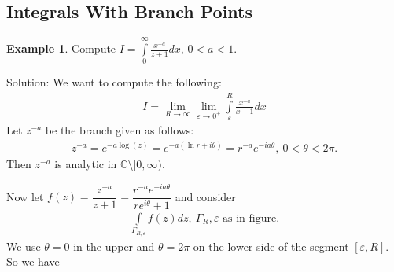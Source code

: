 \documentclass[12pt, a4paper]{article}
\theoremstyle{plain}
\theoremstyle{definition}
\newtheorem{example}{Example} %
\begin{document}
		\subsection{Integrals With Branch Points} %
		\label{sub:integrals_with_branch_points}
			\begin{example}
				Compute $\displaystyle I=\int\limits_{0}^{\infty}\frac{x^{-a}}{z+1}dx$, $0<a<1$.

				Solution: We want to compute the following:
				\begin{align*}
					I = \lim\limits_{R\to\infty}\lim\limits_{\varepsilon\to 0^+}\int\limits_{\varepsilon}^{R}\frac{x^{-a}}{x+1}dx
				\end{align*}
				Let $z^{-a}$ be the branch given as follows:
				\begin{align*}
					z^{-a} = e^{-a\log(z)} = e^{-a(\ln r +i\theta)} = r^{-a}e^{-ia\theta},\:0<\theta<2\pi.
				\end{align*}
				Then $z^{-a}$ is analytic in $\mathbb{C}\setminus[0,\infty)$. 
				\begin{multicols}{2}
					Now let $f(z) = \dfrac{z^{-a}}{z+1} = \dfrac{r^{-a}e^{-ia\theta}}{re^{i\theta}+1}$ and consider
					\begin{align*}
						\int\limits_{\Gamma_{R,\varepsilon}}f(z)dz,\:\Gamma_R,\varepsilon\text{ as in figure}.
					\end{align*}
					We use $\theta=0$ in the upper and $\theta=2\pi$ on the lower side of the segment $[\varepsilon,R]$. So we have
					\begin{figure}[H]
					\centering
\end{figure}
\end{multicols}
\end{example}
\end{document}
